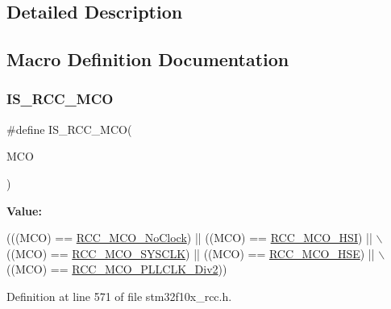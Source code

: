 \subsection{Detailed Description}


\subsection{Macro Definition Documentation}
\mbox{\label{group___clock__source__to__output__on___m_c_o__pin_ga0c2d4d6aa8881e01b8c06d8816284b73}} 
\subsubsection{\texorpdfstring{I\+S\+\_\+\+R\+C\+C\+\_\+\+M\+CO}{IS\_RCC\_MCO}}
{\footnotesize\ttfamily \#define I\+S\+\_\+\+R\+C\+C\+\_\+\+M\+CO(\begin{DoxyParamCaption}\item[{}]{M\+CO }\end{DoxyParamCaption})}

{\bfseries Value\+:}
\begin{DoxyCode}
(((MCO) == \hyperlink{group___clock__source__to__output__on___m_c_o__pin_ga1f39ff9f5606d3ad56e221d253be17d3}{RCC\_MCO\_NoClock}) || ((MCO) == \hyperlink{group___clock__source__to__output__on___m_c_o__pin_ga7206cdf03826781dc4fb1b094475d744}{RCC\_MCO\_HSI}) || \(\backslash\)
                          ((MCO) == \hyperlink{group___clock__source__to__output__on___m_c_o__pin_gab766ad89492ffe915de3438aaa96891b}{RCC\_MCO\_SYSCLK})  || ((MCO) == 
      \hyperlink{group___clock__source__to__output__on___m_c_o__pin_ga8bd64bbefd2a725a0cfe2f2902dd9b0f}{RCC\_MCO\_HSE}) || \(\backslash\)
                          ((MCO) == \hyperlink{group___clock__source__to__output__on___m_c_o__pin_ga1ce4233675bd7bdcb0220ed10ee7d8be}{RCC\_MCO\_PLLCLK\_Div2}))
\end{DoxyCode}


Definition at line 571 of file stm32f10x\+\_\+rcc.\+h.

